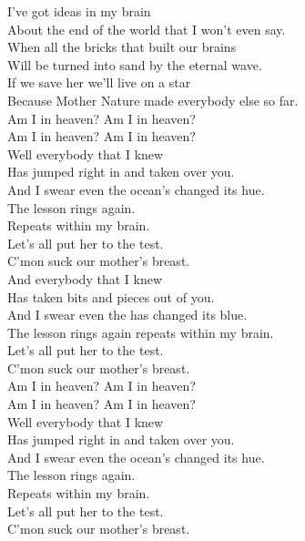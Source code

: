 



I've got ideas in my brain \\
About the end of the world that I won't even say. \\
When all the bricks that built our brains \\
Will be turned into sand by the eternal wave. \\
If we save her we'll live on a star \\
Because Mother Nature made everybody else so far. \\

Am I in heaven? Am I in heaven? \\
Am I in heaven? Am I in heaven? \\

Well everybody that I knew \\
Has jumped right in and taken over you. \\
And I swear even the ocean's changed its hue. \\
The lesson rings again. \\
Repeats within my brain. \\
Let's all put her to the test. \\
C'mon suck our mother's breast. \\

And everybody that I knew\\
Has taken bits and pieces out of you. \\
And I swear even the  has changed its blue. \\
The lesson rings again repeats within my brain. \\
Let's all put her to the test. \\
C'mon suck our mother's breast. \\

Am I in heaven? Am I in heaven? \\
Am I in heaven? Am I in heaven? \\

Well everybody that I knew \\
Has jumped right in and taken over you. \\
And I swear even the ocean's changed its hue. \\
The lesson rings again. \\
Repeats within my brain. \\
Let's all put her to the test. \\
C'mon suck our mother's breast. \\

